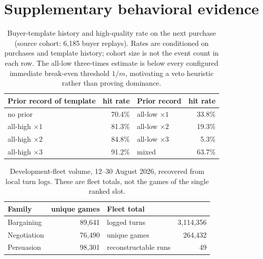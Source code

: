\clearpage
\appendix
\section{Supplementary behavioral evidence}
\setcounter{table}{0}
\renewcommand{\theHtable}{A\arabic{table}}
\renewcommand{\thetable}{A\arabic{table}}

\begin{table}[H]
\centering\small
\caption{Buyer-template history and high-quality rate on the next purchase
(source cohort: 6,185 buyer replays). Rates are conditioned on purchases and
template history; cohort size is not the event count in each row. The all-low
three-times estimate is below every configured immediate break-even threshold
$1/m$, motivating a veto heuristic rather than proving dominance.}
\label{tab:ladder}
\begin{tabular}{@{}lrlr@{}}
\toprule
Prior record of template & hit rate & Prior record & hit rate\\
\midrule
no prior & 70.4\% & all-low $\times1$ & 33.8\%\\
all-high $\times1$ & 81.3\% & all-low $\times2$ & 19.3\%\\
all-high $\times2$ & 84.8\% & all-low $\times3$ & 5.3\%\\
all-high $\times3$ & 91.2\% & mixed & 63.7\%\\
\bottomrule
\end{tabular}
\end{table}

\begin{table}[H]
\centering\small
\caption{Development-fleet volume, 12--30 August 2026, recovered from local
turn logs. These are fleet totals, not the games of the single ranked slot.}
\label{tab:volume}
\begin{tabular}{@{}lrlr@{}}
\toprule
Family & unique games & Fleet total & \\
\midrule
Bargaining & 89,641 & logged turns & 3,114,356\\
Negotiation & 76,490 & unique games & 264,432\\
Persuasion & 98,301 & reconstructable runs & 49\\
\bottomrule
\end{tabular}
\end{table}

